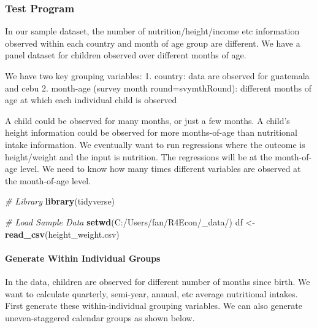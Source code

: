 \documentclass[
]{book}
\newenvironment{Shaded}{\begin{snugshade}}{\end{snugshade}}
\newcommand{\CommentTok}[1]{\textcolor[rgb]{0.56,0.35,0.01}{\textit{#1}}}
\newcommand{\KeywordTok}[1]{\textcolor[rgb]{0.13,0.29,0.53}{\textbf{#1}}}
\newcommand{\NormalTok}[1]{#1}
\newcommand{\StringTok}[1]{\textcolor[rgb]{0.31,0.60,0.02}{#1}}
\begin{document}
\hypertarget{test-program}{%
\subsubsection{Test Program}\label{test-program}}

In our sample dataset, the number of nutrition/height/income etc information observed within each country and month of age group are different. We have a panel dataset for children observed over different months of age.

We have two key grouping variables:
1. country: data are observed for guatemala and cebu
2. month-age (survey month round=svymthRound): different months of age at which each individual child is observed

A child could be observed for many months, or just a few months. A child's height information could be observed for more months-of-age than nutritional intake information. We eventually want to run regressions where the outcome is height/weight and the input is nutrition. The regressions will be at the month-of-age level. We need to know how many times different variables are observed at the month-of-age level.

\begin{Shaded}
\begin{Highlighting}[]
\CommentTok{\# Library}
\KeywordTok{library}\NormalTok{(tidyverse)}

\CommentTok{\# Load Sample Data}
\KeywordTok{setwd}\NormalTok{(}\StringTok{\textquotesingle{}C:/Users/fan/R4Econ/\_data/\textquotesingle{}}\NormalTok{)}
\NormalTok{df \textless{}{-}}\StringTok{ }\KeywordTok{read\_csv}\NormalTok{(}\StringTok{\textquotesingle{}height\_weight.csv\textquotesingle{}}\NormalTok{)}
\end{Highlighting}
\end{Shaded}

\hypertarget{generate-within-individual-groups}{%
\paragraph{Generate Within Individual Groups}\label{generate-within-individual-groups}}

In the data, children are observed for different number of months since birth. We want to calculate quarterly, semi-year, annual, etc average nutritional intakes. First generate these within-individual grouping variables. We can also generate uneven-staggered calendar groups as shown below.
\end{document}
